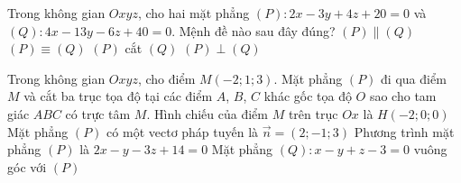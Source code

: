 \begin{ex}%
	Trong  không gian $Oxyz$, cho hai mặt phẳng $(P) \colon 2x - 3y + 4z + 20 = 0$ và $(Q) \colon 4x - 13y - 6z + 40 = 0$. Mệnh đề nào sau đây đúng?
	 \choice
		{$(P) \parallel (Q)$} 
		{$(P)  \equiv (Q)$}
		{\True $(P)$ cắt  $(Q)$}
		 {$(P) \perp (Q)$}
\end{ex}



\begin{ex}%
	Trong không gian $Oxyz$, cho điểm $M(-2; 1; 3)$. Mặt phẳng $(P)$ đi qua điểm $M$ và cắt ba trục tọa độ tại các điểm $A$, $B$, $C$ khác gốc tọa độ $O$ sao cho tam giác $ABC$  có trực tâm $M$.
	 \choiceTF
		{\True Hình chiếu của  điểm $M$ trên trục $Ox$ là $H(-2; 0; 0)$}
		{\True Mặt  phẳng $(P)$ có một vectơ pháp tuyến là $\overrightarrow{n} = (2; -1; 3)$}
		{Phương trình mặt  phẳng $(P)$ là $2x - y - 3z + 14 = 0$}
		{\True Mặt phẳng $(Q)\colon  x - y + z - 3 = 0$ vuông góc với $(P)$}
\end{ex}

